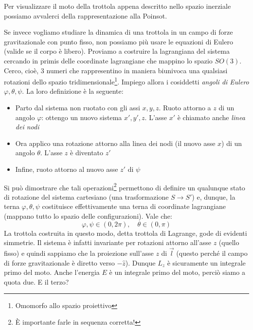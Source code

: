 \documentclass[a4paper,openany]{article}
\begin{document}
	Per visualizzare il moto della trottola appena descritto nello spazio inerziale possiamo avvalerci della rappresentazione alla Poinsot. 
	
	Se invece vogliamo studiare la dinamica di una trottola in un campo di forze gravitazionale con punto fisso, non possiamo più usare le equazioni di Eulero (valide se il corpo è libero). Proviamo a costruire la lagrangiana del sistema cercando in primis delle coordinate lagrangiane che mappino lo spazio $SO(3)$. Cerco, cioè, 3 numeri che rappresentino in maniera biunivoca una qualsiasi rotazioni dello spazio tridimensionale\footnote{Omomorfo allo spazio proiettivo}. Impiego allora i cosiddetti \textit{angoli di Eulero} $\varphi,\theta,\psi$. La loro definizione è la seguente:
	\begin{itemize}
		\item Parto dal sistema non ruotato con gli assi $x,y,z$. Ruoto attorno a $z$ di un angolo $\varphi$: ottengo un nuovo sistema $x',y',z$. L'asse $x'$ è chiamato anche \textit{linea dei nodi}
		\item Ora applico una rotazione attorno alla linea dei nodi (il nuovo asse $x$) di un angolo $\theta$. L'asse $z$ è diventato $z'$
		\item Infine, ruoto attorno al nuovo asse $z'$ di $\psi$
	\end{itemize}
	Si può dimostrare che tali operazioni\footnote{È importante farle in sequenza corretta!} permettono di definire un qualunque stato di rotazione del sistema cartesiano (una trasformazione $S\rightarrow S'$) e, dunque, la terna $\varphi,\theta,\psi$ costituisce effettivamente una terna di coordinate lagrangiane (mappano tutto lo spazio delle configurazioni). Vale che:
	$$
	\varphi, \psi \in (0,2\pi), \quad 	\theta \in (0,\pi)
	$$
	La trottola costruita in questo modo, detta trottola di Lagrange, gode di evidenti simmetrie. Il sistema è infatti invariante per rotazioni attorno all'asse $z$ (quello fisso) e quindi sappiamo che la proiezione sull'asse $z$ di $\vec{l}$ (questo perché il campo di forze gravitazionale è diretto verso $-\hat{z}$). Dunque $L_z$ è sicuramente un integrale primo del moto. Anche l'energia $E$ è un integrale primo del moto, perciò siamo a quota due. E il terzo?
	
\end{document}
